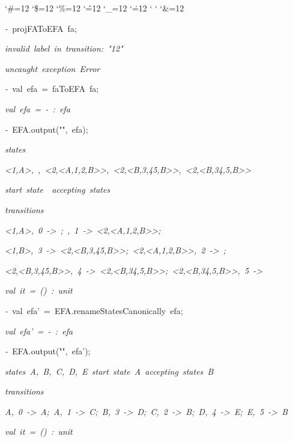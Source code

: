 \begin{list}{}
{\setlength{\leftmargin}{\leftmargini}
\setlength{\rightmargin}{0cm}
\setlength{\itemindent}{0cm}
\setlength{\listparindent}{0cm}
\setlength{\itemsep}{0cm}
\setlength{\parsep}{0cm}
\setlength{\labelsep}{0cm}
\setlength{\labelwidth}{0cm}
\catcode`\#=12
\catcode`\$=12
\catcode`\%=12
\catcode`\^=12
\catcode`\_=12
\catcode`\.=12
\catcode`
\catcode`
\catcode`\&=12
\ttfamily}
\small
\item[]\textsl{-\ }projFAToEFA\ fa;
\item[]\textsl{invalid\ label\ in\ transition:\ "12"}
\item[]
\item[]\textsl{uncaught\ exception\ Error}
\item[]\textsl{-\ }val\ efa\ =\ faToEFA\ fa;
\item[]\textsl{val\ efa\ =\ -\ :\ efa}
\item[]\textsl{-\ }EFA.output("",\ efa);
\item[]\textsl{states}
\item[]\textsl{<1,A>,\ <1,B>,\ <2,<A,1,2,B>>,\ <2,<B,3,45,B>>,\ <2,<B,34,5,B>>}
\item[]\textsl{start\ state\ <1,A>\ accepting\ states\ <1,B>}
\item[]\textsl{transitions}
\item[]\textsl{<1,A>,\ 0\ ->\ <1,A>;\ <1,A>,\ 1\ ->\ <2,<A,1,2,B>>;}
\item[]\textsl{<1,B>,\ 3\ ->\ <2,<B,3,45,B>>;\ <2,<A,1,2,B>>,\ 2\ ->\ <1,B>;}
\item[]\textsl{<2,<B,3,45,B>>,\ 4\ ->\ <2,<B,34,5,B>>;\ <2,<B,34,5,B>>,\ 5\ ->\ <1,B>}
\item[]\textsl{val\ it\ =\ ()\ :\ unit}
\item[]\textsl{-\ }val\ efa'\ =\ EFA.renameStatesCanonically\ efa;
\item[]\textsl{val\ efa'\ =\ -\ :\ efa}
\item[]\textsl{-\ }EFA.output("",\ efa');
\item[]\textsl{states\ A,\ B,\ C,\ D,\ E\ start\ state\ A\ accepting\ states\ B}
\item[]\textsl{transitions}
\item[]\textsl{A,\ 0\ ->\ A;\ A,\ 1\ ->\ C;\ B,\ 3\ ->\ D;\ C,\ 2\ ->\ B;\ D,\ 4\ ->\ E;\ E,\ 5\ ->\ B}
\item[]\textsl{val\ it\ =\ ()\ :\ unit}

\end{list}
